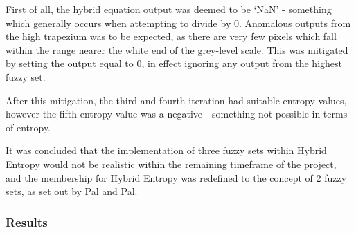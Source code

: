 First of all, the hybrid equation output was deemed to be `NaN' - something which generally occurs when attempting to divide by 0. Anomalous outputs from the high trapezium was to be expected, as there are very few pixels which fall within the range nearer the white end of the grey-level scale. This was mitigated by setting the output equal to 0, in effect ignoring any output from the highest fuzzy set.

After this mitigation, the third and fourth iteration had suitable entropy values, however the fifth entropy value was a negative - something not possible in terms of entropy.


It was concluded that the implementation of three fuzzy sets within Hybrid Entropy would not be realistic within the remaining timeframe of the project, and the membership for Hybrid Entropy was redefined to the concept of 2 fuzzy sets, as set out by Pal and Pal.

\subsubsection{Results}
